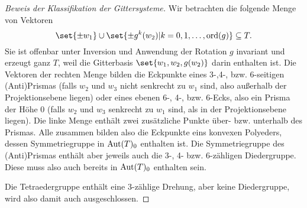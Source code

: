 \begin{proof}[Beweis der Klassifikation der Gittersysteme]
Wir betrachten die folgende Menge von Vektoren
\[\set{\pm w_1}\cup\set{\pm g^k(w_2) | k=0,1,\ldots,\ord(g)} \subseteq T.\]
Sie ist offenbar unter Inversion und Anwendung der Rotation $g$ invariant und erzeugt ganz $T$, weil die Gitterbasis $\set{w_1,w_2,g(w_2)}$ darin enthalten ist. Die Vektoren der rechten Menge bilden die Eckpunkte eines 3-,4-, bzw. 6-seitigen (Anti)Prismas (falls $w_2$ und $w_3$ nicht senkrecht zu $w_1$ sind, also außerhalb der Projektionsebene liegen) oder eines ebenen 6-, 4-, bzw. 6-Ecks, also ein Prisma der Höhe 0 (falls $w_2$ und $w_3$ senkrecht zu $w_1$ sind, als in der Projektionsebene liegen). Die linke Menge enthält zwei zusätzliche Punkte über- bzw. unterhalb des Prismas. Alle zusammen bilden also die Eckpunkte eins konvexen Polyeders, dessen Symmetriegruppe in $\operatorname{Aut}(T)_0$ enthalten ist. Die Symmetriegruppe des (Anti)Prismas enthält aber jeweils auch die 3-, 4- bzw. 6-zähligen Diedergruppe. Diese muss also auch bereits in $\operatorname{Aut}(T)_0$ enthalten sein.

Die Tetraedergruppe enthält eine 3-zählige Drehung, aber keine Diedergruppe, wird also damit auch ausgeschlossen.
\end{proof}